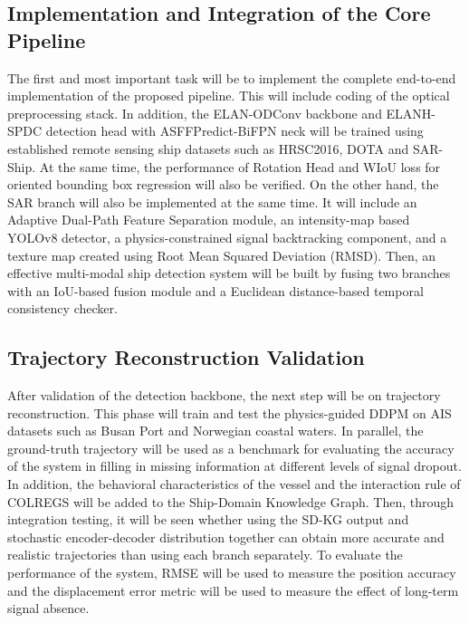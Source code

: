 \subsection{Implementation and Integration of the Core Pipeline}
The first and most important task will be to implement the complete end-to-end implementation of the proposed pipeline. This will include coding of the optical preprocessing stack. In addition, the ELAN-ODConv backbone and ELANH-SPDC detection head with ASFFPredict-BiFPN neck will be trained using established remote sensing ship datasets such as HRSC2016, DOTA and SAR-Ship. At the same time, the performance of Rotation Head and WIoU loss for oriented bounding box regression will also be verified. On the other hand, the SAR branch will also be implemented at the same time. It will include an Adaptive Dual-Path Feature Separation module, an intensity-map based YOLOv8 detector, a physics-constrained signal backtracking component, and a texture map created using Root Mean Squared Deviation (RMSD). Then, an effective multi-modal ship detection system will be built by fusing two branches with an IoU-based fusion module and a Euclidean distance-based temporal consistency checker.

\subsection{Trajectory Reconstruction Validation}
After validation of the detection backbone, the next step will be on trajectory reconstruction. This phase will train and test the physics-guided DDPM on AIS datasets such as Busan Port and Norwegian coastal waters. In parallel, the ground-truth trajectory will be used as a benchmark for evaluating the accuracy of the system in filling in missing information at different levels of signal dropout. In addition, the behavioral characteristics of the vessel and the interaction rule of COLREGS will be added to the Ship-Domain Knowledge Graph. Then, through integration testing, it will be seen whether using the SD-KG output and stochastic encoder-decoder distribution together can obtain more accurate and realistic trajectories than using each branch separately. To evaluate the performance of the system, RMSE will be used to measure the position accuracy and the displacement error metric will be used to measure the effect of long-term signal absence. 

